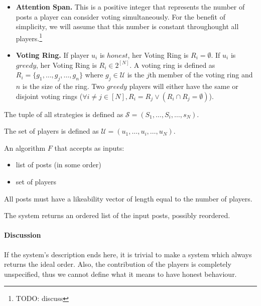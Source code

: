 \begin{definition}[Player]
\begin{itemize}
\begin{itemize}
          \item \textbf{Attention Span.} This is a positive integer that
          represents the number of posts a player can consider voting
          simultaneously. For the benefit of simplicity, we will assume that this
          number is constant throughought all players.\footnote{TODO: discuss}

          \item \textbf{Voting Ring.}  If player $u_i$ is $honest$, her Voting
          Ring is $R_i = \emptyset$. If $u_i$ is $greedy$, her Voting Ring is $R_i
          \in 2^{\left[N\right]}$. A voting ring is defined as $R_i = \lbrace
          g_1, \dots, g_j, \dots, g_n \rbrace$ where $g_j \in \mathcal{U}$ is the
          $j$th member of the voting ring and $n$ is the size of the ring. Two
          $greedy$ players will either have the same or disjoint voting rings
          ($\forall i \neq j \in \left[N\right], R_i = R_j \vee \left(R_i \cap
          R_j = \emptyset\right)$).
        \end{itemize}
        The tuple of all strategies is defined as $\mathcal{S} = (S_1, \dots,
        S_i, \dots, s_N)$.
      \end{itemize}
      The set of players is defined as $\mathcal{U} = \left(u_1, \dots, u_i,
      \dots, u_N\right)$.
    \end{definition}

    \begin{definition}
      An algorithm $F$ that accepts as inputs:
      \begin{itemize}
        \item list of posts (in some order)
        \item set of players
      \end{itemize}
      All posts must have a likeability vector of length equal to the number of
      players.

      The system returns an ordered list of the input posts, possibly reordered.
    \end{definition}

    \paragraph{Discussion}
      If the system's description ends here, it is trivial to make a system
      which always returns the ideal order. Also, the contribution of the
      players is completely unspecified, thus we cannot define what it means to
      have honest behaviour.

